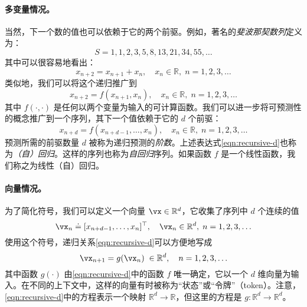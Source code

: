 \documentclass[../../book-main_zh.tex]{subfiles}
\begin{document}
\paragraph{多变量情况。}
当然，下一个数的值也可以依赖于它的两个前驱。例如，著名的{\em 斐波那契数列}定义为：
\begin{equation}
    {S} = 1, 1, 2, 3, 5, 8, 13, 21, 34, 55, \ldots
\end{equation}
其中可以很容易地看出：
\begin{equation}
    x_{n+2} = x_{n+1} + x_{n}, \quad  x_n \in \mathbb{R}, \;  n = 1, 2, 3, \ldots
\end{equation}
类似地，我们可以将这个递归推广到 \begin{equation}
    x_{n+2} = f(x_{n+1}, x_{n}), \quad x_n \in \mathbb{R}, \;  n =  1, 2, 3, \ldots
\end{equation}
其中 $f(\cdot,\cdot)$ 是任何以两个变量为输入的可计算函数。我们可以进一步将可预测性的概念推广到一个序列，其下一个值依赖于它的 $d$ 个前驱：
\begin{equation}
    x_{n+d} = f(x_{n+d-1}, \ldots,  x_{n}), \quad  x_n \in \mathbb{R}, \; n =  1, 2, 3, \ldots
    \label{eqn:recursive-d}
\end{equation}
预测所需的前驱数量 $d$ 被称为递归预测的{\em 阶数}。上述表达式\eqref{eqn:recursive-d}也称为{\em （自）回归}。这样的序列也称为{\em 自回归}序列。如果函数 $f$ 是一个线性函数，我们称之为线性（自）回归。

\paragraph{向量情况。} 
为了简化符号，我们可以定义一个向量 $\vx \in \mathbb{R}^d$，它收集了序列中 $d$ 个连续的值 \begin{equation}
    \vx_n \doteq [x_{n+d-1}, \ldots,  x_{n}]^\top, \quad \vx_n \in \mathbb{R}^d, \; n = 1, 2, 3, \ldots
\end{equation}
使用这个符号，递归关系\eqref{eqn:recursive-d}可以方便地写成
\begin{equation}
    \vx_{n+1} = g(\vx_{n}) \; \in \mathbb{R}^d, \quad n =  1, 2, 3, \ldots
    \label{eqn:recursive-v}
\end{equation}
其中函数 $g(\cdot)$ 由\eqref{eqn:recursive-d}中的函数 $f$ 唯一确定，它以一个 $d$ 维向量为输入。在不同的上下文中，这样的向量有时被称为“状态”或“令牌”（token）。注意，\eqref{eqn:recursive-d}中的方程表示一个映射 $\mathbb{R}^d \rightarrow \mathbb{R}$，但这里的方程是 $g: \mathbb{R}^d \rightarrow \mathbb{R}^d$。
\end{document}
